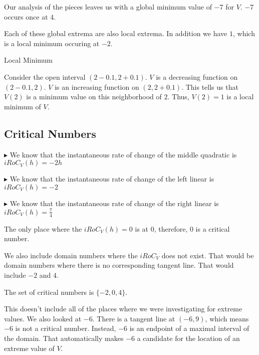 \documentclass{ximera}
\begin{document}
Our analysis of the pieces leaves us with a global minimum value of $-7$ for $V$. $-7$ occurs once at $4$.



Each of these global extrema are also local extrema.  In addition we have $1$, which is a local minimum occuring at $-2$.  

\begin{explanation} Local Minimum


Consider the open interval $(2 - 0.1, 2 + 0.1)$. $V$ is a decreasing function on $(2 - 0.1, 2)$. $V$ is an increasing function on $(2, 2 + 0.1)$.  This tells us that $V(2)$ is a minimum value on this neighborhood of $2$.  Thus, $V(2)=1$ is a local minimum of $V$.





\end{explanation}









\subsection{Critical Numbers} 


$\blacktriangleright$ We know that the instantaneous rate of change of the middle quadratic is $iRoC_V(h) = -2h$ 

$\blacktriangleright$ We know that the instantaneous rate of change of the left linear is $iRoC_V(h) = -2$

$\blacktriangleright$ We know that the instantaneous rate of change of the right linear is $iRoC_V(h) = \frac{7}{4}$



The only place where the $iRoC_V(h) = 0$ is at $0$, therefore, $0$ is a critical number.


We also include domain numbers where the $iRoC_V$ does not exist.  That would be domain numbers where there is no corresponding tangent line.  That would include $-2$ and $4$.



The set of critical numbers is $\{ -2, 0, 4 \}$.




This doesn't include all of the places where we were investigating for extreme values. We also looked at $-6$.  There is a tangent line at $(-6, 9)$, which means $-6$ is not a critical number. Instead, $-6$ is an endpoint of a maximal interval of the domain. That automatically makes $-6$ a candidate for the location of an extreme value of $V$.
\end{document}
